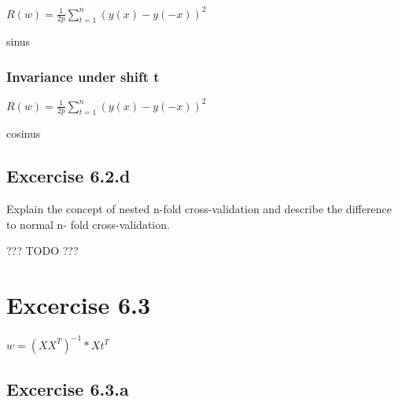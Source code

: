 \documentclass[a4paper,headings=small]{scrartcl}
\numberwithin{equation}{section} %
\numberwithin{figure}{section}   %
\begin{document}
$R(w) = \frac{1}{2p} \sum_{t=1}^n (y(x) - y(-x))^2$

sinus


\subsubsection{Invariance under shift t}

$R(w) = \frac{1}{2p} \sum_{t=1}^n (y(x) - y(-x))^2$

cosinus


\subsection{Excercise 6.2.d}

Explain the concept of nested n-fold cross-validation and describe the difference to normal n-
fold cross-validation.

??? TODO ???


\section{Excercise 6.3}

$w = (XX^T)^{-1} * Xt^T$

\subsection{Excercise 6.3.a}
\end{document}
